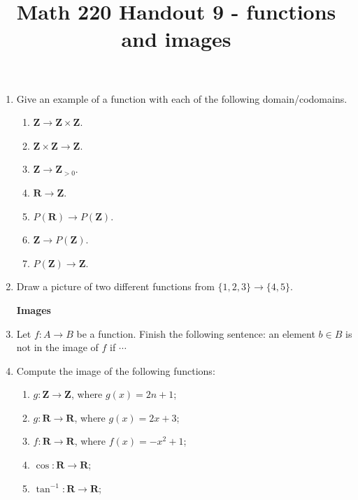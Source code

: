 \documentclass[12pt, reqno]{amsart}
\begin{document}
\title[Math 220 Handout 9 - functions and images]{Math 220 Handout 9  - functions and images}\maketitle

\begin{enumerate}
\item Give an example of a function with each of the following
  domain/codomains.
  \begin{enumerate}
  \item $\mathbf{Z} \to \mathbf{Z} \times \mathbf{Z}$.
  \item $\mathbf{Z} \times \mathbf{Z} \to \mathbf{Z}$.
  \item $\mathbf{Z} \to \mathbf{Z}_{>0}$.
  \item $\mathbf{R} \to \mathbf{Z}$.
  \item $P(\mathbf{R}) \to P(\mathbf{Z})$.
  \item $\mathbf{Z} \to P(\mathbf{Z})$.
  \item $P(\mathbf{Z}) \to \mathbf{Z}$.
  \end{enumerate}
  \vspace{11cm}


\item Draw a picture of two different functions from $\{1,2,3\} \to \{4,5\}$.


\newpage 

\begin{center}
  \textbf{Images}
\end{center}




\item Let $f\colon A \to B$ be a function. Finish the following
  sentence: an element $b \in B$ is not in the image of $f$ if
  $\cdots$\\\vspace{2cm}


\item Compute the image of the following functions:
  \begin{enumerate}

  \item $g \colon \mathbf{Z} \to \mathbf{Z}$, where $g(x) = 2n + 1$;
  \item $g \colon \mathbf{R} \to \mathbf{R}$, where $g(x) = 2x + 3$;
  \item $f \colon \mathbf{R} \to \mathbf{R}$, where $f(x) = -x^2 + 1$;
  \item $\cos \colon \mathbf{R} \to \mathbf{R}$;
  \item $\tan^{-1} \colon \mathbf{R} \to \mathbf{R}$;
  \end{enumerate}
\vspace{1in}







\end{enumerate}
\end{document}
